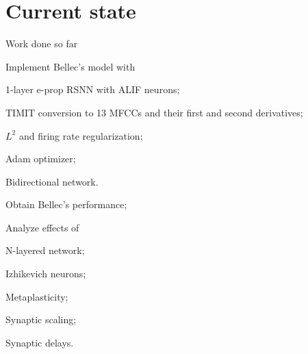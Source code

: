 \documentclass[t]{beamer}
\newcommand{\cmark}{\ding{51}}%
\newcommand{\done}{\rlap{$\square$}{\raisebox{2pt}{\large\hspace{1pt}\cmark}}%
\hspace{-2.5pt}}
\begin{document}
\section{Current state}
\begin{frame}{Work done so far}
	\begin{todolist}

    \item[\done] Implement Bellec's model with
    \begin{todolist}
    	\item[\done] 1-layer e-prop RSNN with ALIF neurons;
    	\item[\done] TIMIT conversion to 13 MFCCs and their first and second derivatives;
    	\item[\done] $L^2$ and firing rate regularization;
    	\item[\done] Adam optimizer;
    \item[\done] Bidirectional network.
    \end{todolist}
    \item Obtain Bellec's performance;
    \item Analyze effects of
    \begin{todolist}
    	\item N-layered network;
    \item Izhikevich neurons;
    	\item Metaplasticity;
    	\item Synaptic scaling;
    	\item Synaptic delays.
    \end{todolist}
  \end{todolist}
  

\end{frame}
\end{document}
